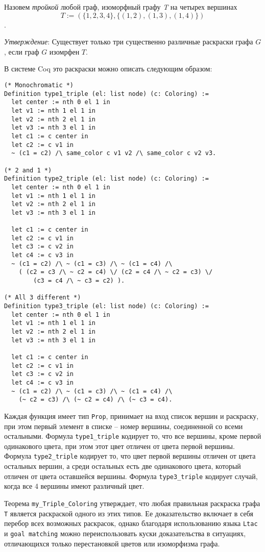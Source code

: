 Назовем {\it тройкой} любой граф, изоморфный графу {\it T} на четырех вершинах $$T := (\{1, 2, 3, 4\} , \{(1, 2), (1, 3), (1, 4) \} )$$.

{\it Утверждение}: Существует только три существенно различные раскраски графа $G$, если граф $G$ изомрфен $T$.

В системе Coq это раскраски можно описать следующим образом:

\begin{verbatim}
(* Monochromatic *)
Definition type1_triple (el: list node) (c: Coloring) :=
  let center := nth 0 el 1 in
  let v1 := nth 1 el 1 in
  let v2 := nth 2 el 1 in
  let v3 := nth 3 el 1 in
  let c1 := c center in
  let c2 := c v1 in
  ~ (c1 = c2) /\ same_color c v1 v2 /\ same_color c v2 v3.

(* 2 and 1 *)
Definition type2_triple (el: list node) (c: Coloring) :=
  let center := nth 0 el 1 in
  let v1 := nth 1 el 1 in
  let v2 := nth 2 el 1 in
  let v3 := nth 3 el 1 in

  let c1 := c center in
  let c2 := c v1 in
  let c3 := c v2 in 
  let c4 := c v3 in
  ~ (c1 = c2) /\ ~ (c1 = c3) /\ ~ (c1 = c4) /\
    ( (c2 = c3 /\ ~ c2 = c4) \/ (c2 = c4 /\ ~ c2 = c3) \/ 
        (c3 = c4 /\ ~ c3 = c2) ).

(* All 3 different *)
Definition type3_triple (el: list node) (c: Coloring) :=
  let center := nth 0 el 1 in
  let v1 := nth 1 el 1 in
  let v2 := nth 2 el 1 in
  let v3 := nth 3 el 1 in

  let c1 := c center in
  let c2 := c v1 in
  let c3 := c v2 in 
  let c4 := c v3 in
  ~ (c1 = c2) /\ ~ (c1 = c3) /\ ~ (c1 = c4) /\
    (~ c2 = c3) /\ (~ c2 = c4) /\ (~ c3 = c4).
\end{verbatim}

Каждая функция имеет тип {\tt Prop}, принимает на вход список вершин и раскраску, при этом первый элемент в списке -- номер вершины, соединенной со всеми остальными. Формула {\tt type1\_triple} кодирует то, что все вершины, кроме первой одинакового цвета, при этом этот цвет отличен от цвета первой вершины. Формула {\tt type2\_triple} кодирует то, что цвет первой вершины отличен от цвета остальных вершин, а среди остальных есть две одинакового цвета, который отличен от цвета оставшейся вершины. Формула {\tt type3\_triple} кодирует случай, когда все 4 вершины имеют различный цвет.

Теорема {\tt my\_Triple\_Coloring} утверждает, что любая правильная раскраска графа {\tt T} является раскраской одного из этих типов. Ее доказательство включает в себя перебор всех возможных раскрасок, однако благодаря использованию языка {\tt Ltac} и {\tt goal matching} можно переиспользовать куски доказательства в ситуациях, отличающихся только перестановкой цветов или изоморфизма графа.

